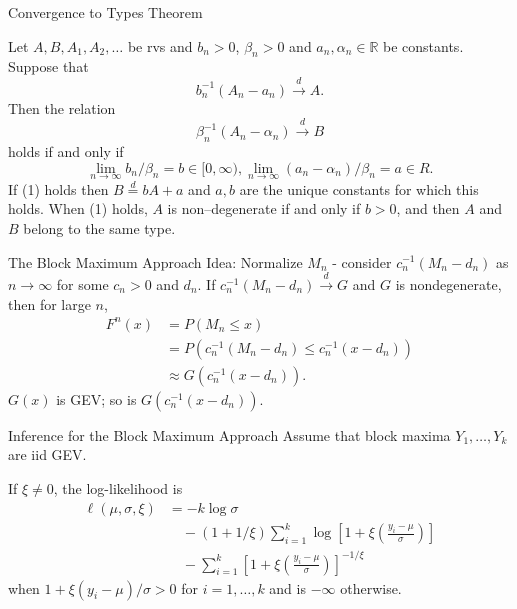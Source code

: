 \documentclass{beamer}
\begin{document}
\begin{frame}{Convergence to Types Theorem}
    \begin{theorem}
        Let $A, B, A_1, A_2, \ldots$ be rvs and $b_n > 0$, $\beta_n > 0$ and $a_n, \alpha_n \in \mathbb{R}$ be constants. Suppose that
        \[
        b_n^{-1}(A_n - a_n) \xrightarrow{d} A.
        \]
        Then the relation
        \[
        \beta_n^{-1}(A_n - \alpha_n) \xrightarrow{d} B \tag{1}
        \]
        holds if and only if
        \[
        \lim_{n \to \infty} b_n / \beta_n = b \in [0, \infty), \lim_{n \to \infty} (a_n - \alpha_n) / \beta_n = a \in R. \tag{2}
        \]
        If (1) holds then $B \overset{d}{=} b A + a$ and $a, b$ are the unique constants for which this holds. When (1) holds, $A$ is non–degenerate if and only if $b > 0$, and then $A$ and $B$ belong to the same type.
    \end{theorem}
\end{frame}

\begin{frame}{The Block Maximum Approach}
    Idea: Normalize $M_n$ - consider $c_n^{-1}(M_n - d_n)$ as $n \to \infty$ for some $c_n > 0$ and $d_n$. If $c_n^{-1}(M_n - d_n) \xrightarrow{d} G$ and $G$ is nondegenerate, then for large $n$,
    \begin{align*}
        F^n(x) &= P(M_n \le x) \\
        &= P(c_n^{-1}(M_n - d_n) \le c_n^{-1}(x - d_n)) \\
        &\approx G(c_n^{-1}(x - d_n)).
    \end{align*}
    $G(x)$ is GEV; so is $G(c_n^{-1}(x - d_n))$.
\end{frame}

\begin{frame}{Inference for the Block Maximum Approach}
    Assume that block maxima $Y_1, \ldots, Y_k$ are iid GEV.

    \medskip
    
    If $\xi \ne 0$, the log-likelihood is
    \begin{align*}
        \ell(\mu, \sigma, \xi) &= -k\log\sigma \\
        &\quad - (1 + 1 / \xi)\sum_{i = 1}^k \log\left[1 + \xi\left(\frac{y_i - \mu}{\sigma}\right)\right] \\
        &\quad - \sum_{i = 1}^k \left[1 + \xi\left(\frac{y_i - \mu}{\sigma}\right)\right]^{-1 / \xi}
    \end{align*}
    when $1 + \xi(y_i - \mu) / \sigma > 0$ for $i = 1, \ldots, k$ and is $-\infty$ otherwise.
\end{frame}
\end{document}
